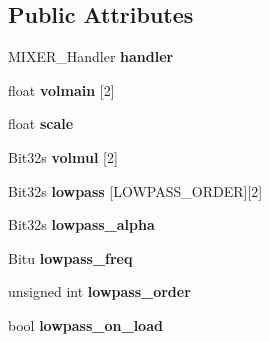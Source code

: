 \subsection*{Public Attributes}
\begin{DoxyCompactItemize}
\item 
\hypertarget{classMixerChannel_af892cf680b396c0e93a54e3da905ad04}{M\-I\-X\-E\-R\-\_\-\-Handler {\bfseries handler}}\label{classMixerChannel_af892cf680b396c0e93a54e3da905ad04}

\item 
\hypertarget{classMixerChannel_a5dd50a86b6a77a81a6e809ca0aa1e20b}{float {\bfseries volmain} \mbox{[}2\mbox{]}}\label{classMixerChannel_a5dd50a86b6a77a81a6e809ca0aa1e20b}

\item 
\hypertarget{classMixerChannel_aa8dad87dcc79454e5918b3a7eebaed6b}{float {\bfseries scale}}\label{classMixerChannel_aa8dad87dcc79454e5918b3a7eebaed6b}

\item 
\hypertarget{classMixerChannel_a00091530e71a29cbde320013e15390cd}{Bit32s {\bfseries volmul} \mbox{[}2\mbox{]}}\label{classMixerChannel_a00091530e71a29cbde320013e15390cd}

\item 
\hypertarget{classMixerChannel_a53983eb8a65bfb327a2a13608d506093}{Bit32s {\bfseries lowpass} \mbox{[}L\-O\-W\-P\-A\-S\-S\-\_\-\-O\-R\-D\-E\-R\mbox{]}\mbox{[}2\mbox{]}}\label{classMixerChannel_a53983eb8a65bfb327a2a13608d506093}

\item 
\hypertarget{classMixerChannel_aec25b33e66a92276790fd5007bef05b8}{Bit32s {\bfseries lowpass\-\_\-alpha}}\label{classMixerChannel_aec25b33e66a92276790fd5007bef05b8}

\item 
\hypertarget{classMixerChannel_a5acf5f4237c343cceda3e4b168713bf2}{Bitu {\bfseries lowpass\-\_\-freq}}\label{classMixerChannel_a5acf5f4237c343cceda3e4b168713bf2}

\item 
\hypertarget{classMixerChannel_ad883c95fc5dee02d0e5f375cfb4f9d05}{unsigned int {\bfseries lowpass\-\_\-order}}\label{classMixerChannel_ad883c95fc5dee02d0e5f375cfb4f9d05}

\item 
\hypertarget{classMixerChannel_ac0b87191c55d5626b8287edff81011dd}{bool {\bfseries lowpass\-\_\-on\-\_\-load}}\label{classMixerChannel_ac0b87191c55d5626b8287edff81011dd}


\end{DoxyCompactItemize}
